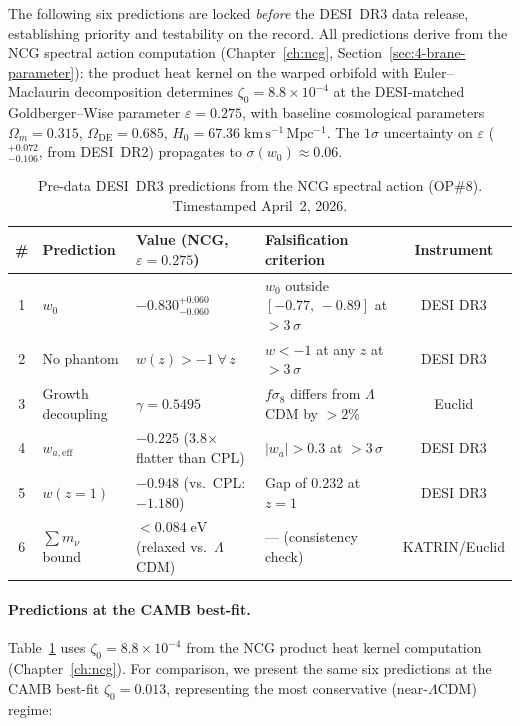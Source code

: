The following six predictions are locked \emph{before} the DESI~DR3 data release, establishing priority and testability on the record. All predictions derive from the NCG spectral action computation (Chapter~\ref{ch:ncg}, Section~\ref{sec:4-brane-parameter}): the product heat kernel on the warped orbifold with Euler--Maclaurin decomposition determines $\zeta_0 = 8.8 \times 10^{-4}$ at the DESI-matched Goldberger--Wise parameter $\varepsilon = 0.275$, with baseline cosmological parameters $\Omega_m = 0.315$, $\Omega_\mathrm{DE} = 0.685$, $H_0 = 67.36\;\mathrm{km\,s^{-1}\,Mpc^{-1}}$.  The $1\sigma$ uncertainty on $\varepsilon$ (${}^{+0.072}_{-0.106}$, from DESI~DR2) propagates to $\sigma(w_0) \approx 0.06$.

\begin{table}[htbp]
\centering
\caption{Pre-data DESI~DR3 predictions from the NCG spectral action (OP\#8). Timestamped April~2, 2026.}
\label{tab:2-DR3-predictions}
\small
\begin{tabular}{@{}clllc@{}}
\toprule
\# & Prediction & Value (NCG, $\varepsilon = 0.275$) & Falsification criterion & Instrument \\
\midrule
1 & $w_0$ & $-0.830^{+0.060}_{-0.060}$ & $w_0$ outside $[-0.77,\, -0.89]$ at $>3\,\sigma$ & DESI DR3 \\[3pt]
2 & No phantom & $w(z) > -1\;\forall\, z$ & $w < -1$ at any $z$ at $>3\,\sigma$ & DESI DR3 \\[3pt]
3 & Growth decoupling & $\gamma = 0.5495$ & $f\sigma_8$ differs from $\Lambda$CDM by $>2\%$ & Euclid \\[3pt]
4 & $w_{a,\mathrm{eff}}$ & $-0.225$ (3.8$\times$ flatter than CPL) & $|w_a| > 0.3$ at $>3\,\sigma$ & DESI DR3 \\[3pt]
5 & $w(z{=}1)$ & $-0.948$ (vs.\ CPL: $-1.180$) & Gap of 0.232 at $z = 1$ & DESI DR3 \\[3pt]
6 & $\sum m_\nu$ bound & $< 0.084\;\mathrm{eV}$ (relaxed vs.\ $\Lambda$CDM) & --- (consistency check) & KATRIN/Euclid \\
\bottomrule
\end{tabular}
\end{table}

\paragraph{Predictions at the CAMB best-fit.}
Table~\ref{tab:2-DR3-predictions} uses $\zeta_0 = 8.8 \times 10^{-4}$ from the NCG product heat kernel computation (Chapter~\ref{ch:ncg}).  For comparison, we present the same six predictions at the CAMB best-fit $\zeta_0 = 0.013$, representing the most conservative (near-$\Lambda$CDM) regime:

